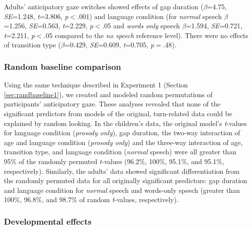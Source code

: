 \documentclass[authoryear, 12pt]{elsarticle}
\begin{document}
Adults' anticipatory gaze switches showed effects of gap duration (\textit{$\beta$}=4.75, \textit{SE}=1.248, \textit{t}=3.806, \textit{p}$<$.001) and language condition (for \textit{normal} speech \textit{$\beta$}=1.256, \textit{SE}=0.563, \textit{t}=2.229, \textit{p}$<$.05 and \textit{words only} speech \textit{$\beta$}=1.594, \textit{SE}=0.721, \textit{t}=2.211, \textit{p}$<$.05  compared to the \textit{no speech} reference level). There were no effects of transition type (\textit{$\beta$}=0.429, \textit{SE}=0.609, \textit{t}=0.705, \textit{p}$=$.48).

\subsubsection{Random baseline comparison}
\label{sec:randbaseline2}

Using the same technique described in Experiment 1 (Section \ref{sec:randbaseline1}), we created and modeled random permutations of participants' anticipatory gaze. These analyses revealed that none of the significant predictors from models of the original, turn-related data could be explained by random looking. In the children's data, the original model's \textit{t}-values for language condition (\textit{prosody only}), gap duration, the two-way interaction of age and language condition (\textit{prosody only}) and the three-way interaction of age, transition type, and language condition (\textit{normal} speech) were all greater than 95\% of the randomly permuted \textit{t}-values (96.2\%, 100\%, 95.1\%, and 95.1\%, respectively). Similarly, the adults' data showed significant differentiation from the randomly permuted data for all originally significant predictors: gap duration and language condition for \textit{normal} speech and words-only speech (greater than 100\%, 96.8\%, and 98.7\% of random \textit{t}-values, respectively). 

\subsubsection{Developmental effects}
\end{document}
